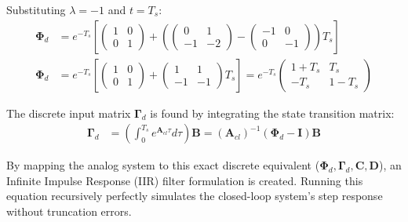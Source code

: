 \documentclass[journal,12pt,onecolumn]{IEEEtran}
\theoremstyle{remark}
\begin{document}
Substituting $\lambda = -1$ and $t = T_s$:
\begin{align*}
\mathbf{\Phi}_d &= e^{-T_s} \left[ \begin{pmatrix} 1 & 0 \\ 0 & 1 \end{pmatrix} + \left( \begin{pmatrix} 0 & 1 \\ -1 & -2 \end{pmatrix} - \begin{pmatrix} -1 & 0 \\ 0 & -1 \end{pmatrix} \right) T_s \right] \\
\mathbf{\Phi}_d &= e^{-T_s} \left[ \begin{pmatrix} 1 & 0 \\ 0 & 1 \end{pmatrix} + \begin{pmatrix} 1 & 1 \\ -1 & -1 \end{pmatrix} T_s \right] = e^{-T_s} \begin{pmatrix} 1+T_s & T_s \\ -T_s & 1-T_s \end{pmatrix}
\end{align*}

The discrete input matrix $\mathbf{\Gamma}_d$ is found by integrating the state transition matrix:
\begin{align*}
\mathbf{\Gamma}_d &= \left( \int_0^{T_s} e^{\mathbf{A}_{cl}\tau} d\tau \right) \mathbf{B} = (\mathbf{A}_{cl})^{-1} (\mathbf{\Phi}_d - \mathbf{I}) \mathbf{B}
\end{align*}

By mapping the analog system to this exact discrete equivalent ($\mathbf{\Phi}_d, \mathbf{\Gamma}_d, \mathbf{C}, \mathbf{D}$), an Infinite Impulse Response (IIR) filter formulation is created. Running this equation recursively perfectly simulates the closed-loop system's step response without truncation errors.
\end{document}
